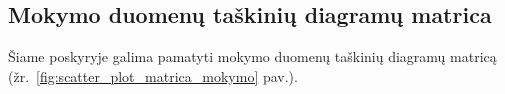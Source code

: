 \subsection{Mokymo duomenų taškinių diagramų matrica}
\label{subsec:mokymo_duomenu_taskiniu_diagramu_matrica}

Šiame poskyryje galima pamatyti mokymo duomenų taškinių diagramų matricą (žr.~\ref{fig:scatter_plot_matrica_mokymo} pav.).

